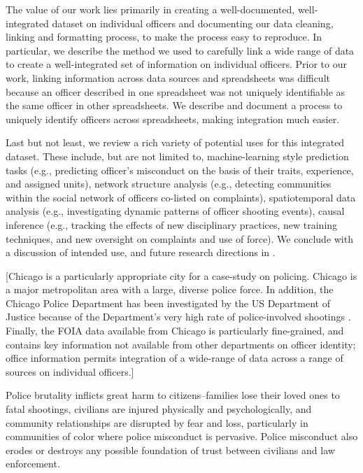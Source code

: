 The value of our work lies primarily in creating a well-documented,
well-integrated dataset on individual officers and documenting our data
cleaning, linking and formatting process, to make the process easy to
reproduce. In particular, we describe the method we used to carefully link
a wide range of data to create a well-integrated set of information on
individual officers. Prior to our work, linking information across data sources
and spreadsheets was difficult because an officer described in one spreadsheet
was not uniquely identifiable as the same officer in other spreadsheets. We
describe and document a process to uniquely identify officers across
spreadsheets, making integration much easier.

Last but not least, we review a rich variety of potential uses for this
integrated dataset. These include, but are not limited to, machine-learning
style prediction tasks (e.g., predicting officer's misconduct on the basis of
their traits, experience, and assigned units), network structure analysis
(e.g., detecting communities within the social network of officers co-listed on
complaints), spatiotemporal data analysis (e.g., investigating dynamic patterns
of officer shooting events), causal inference (e.g., tracking the effects of
new disciplinary practices, new training techniques, and new oversight on
complaints and use of force). We conclude with a discussion of intended use,
and future research directions in .

[Chicago is a particularly appropriate city for a case-study on policing.
Chicago is a major metropolitan area with a large, diverse police force. In
addition, the Chicago Police Department has been investigated by the US
Department of Justice because of the Department’s very high rate of
police-involved shootings \cite{DoJ17}. Finally, the FOIA data available from Chicago is
particularly fine-grained, and contains key information not available from
other departments on officer identity; office information permits integration
of a wide-range of data across a range of sources on individual officers.]

\iffalse
Police brutality inflicts great harm to citizens--families lose their loved
ones to fatal shootings, civilians are injured physically and psychologically,
and community relationships are disrupted by fear and loss, particularly in
communities of color where police misconduct is pervasive. Police misconduct
also erodes or destroys any possible foundation of trust between civilians and
law enforcement. 

